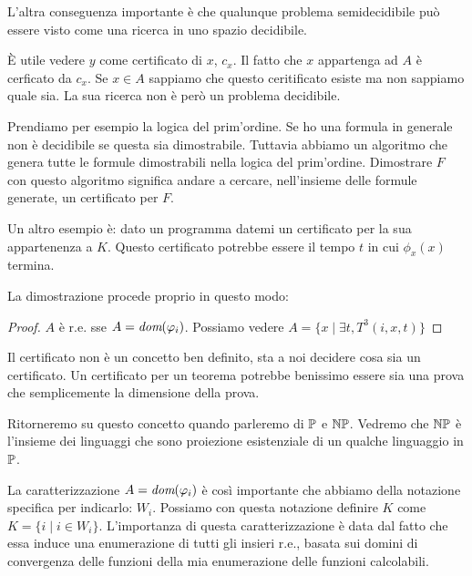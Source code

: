 L'altra conseguenza importante è che qualunque problema semidecidibile può essere visto come una
ricerca in uno spazio decidibile.

È utile vedere $y$ come certificato di $x$, $c_{x}$. Il fatto che $x$ appartenga ad $A$ è cerficato da
$c_{x}$. Se $x \in A$ sappiamo che questo ceritificato esiste ma non sappiamo quale sia. La sua
ricerca non è però un problema decidibile.

Prendiamo per esempio la logica del prim'ordine. Se ho una formula in generale non è decidibile se
questa sia dimostrabile. Tuttavia abbiamo un algoritmo che genera tutte le formule dimostrabili nella
logica del prim'ordine. Dimostrare $F$ con questo algoritmo significa andare a cercare, nell'insieme
delle formule generate, un certificato per $F$. 

Un altro esempio è: dato un programma datemi un certificato per la sua appartenenza a $K$. Questo
certificato potrebbe essere il tempo $t$ in cui $\phi_{x}(x)$ termina.

La dimostrazione procede proprio in questo modo:

\begin{proof}
    $A$ è r.e. sse $A = \textit{dom}(\varphi_{i})$. Possiamo vedere $A = \{x \mid \exists t, T^{3}(i,x,t)\}$
\end{proof}

Il certificato non è un concetto ben definito, sta a noi decidere cosa sia un certificato. Un
certificato per un teorema potrebbe benissimo essere sia una prova che semplicemente la dimensione
della prova.

Ritorneremo su questo concetto quando parleremo di $\mathbb{P}$ e $\mathbb{NP}$. Vedremo che $\mathbb{NP}$ è l'insieme dei
linguaggi che sono proiezione esistenziale di un qualche linguaggio in $\mathbb{P}$. 

La caratterizzazione $A = \textit{dom}(\varphi_{i})$ è così importante che abbiamo della notazione specifica per
indicarlo: $W_{i}$. Possiamo con questa notazione definire $K$ come $K = \{i \mid i \in W_{i}\}$.
L'importanza di questa caratterizzazione è data dal fatto che essa induce una enumerazione di tutti
gli insieri r.e., basata sui domini di convergenza delle funzioni della mia enumerazione delle
funzioni calcolabili.

